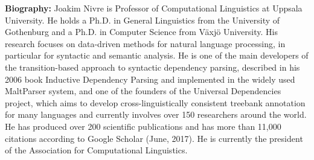
\noindent
{\bfseries Biography:} Joakim Nivre is Professor of Computational Linguistics at Uppsala University. He holds a Ph.D. in General Linguistics from the University of Gothenburg and a Ph.D. in Computer Science from Växjö University. His research focuses on data-driven methods for natural language processing, in particular for syntactic and semantic analysis. He is one of the main developers of the transition-based approach to syntactic dependency parsing, described in his 2006 book Inductive Dependency Parsing and implemented in the widely used MaltParser system, and one of the founders of the Universal Dependencies project, which aims to develop cross-linguistically consistent treebank annotation for many languages and currently involves over 150 researchers around the world. He has produced over 200 scientific publications and has more than 11,000 citations according to Google Scholar (June, 2017). He is currently the president of the Association for Computational Linguistics. 

\newpage
